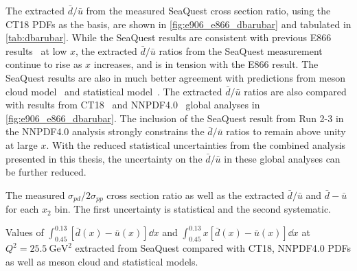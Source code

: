 \documentclass[reprint,aps,unsortedaddress,superscriptaddress,prc,floatfix,showpacs,linenumbers,final]{revtex4-2}
\begin{document}
The extracted $\bar{d}/\bar{u}$ from the measured SeaQuest cross section ratio,
using the CT18 PDFs as the basis, are shown in \cref{fig:e906_e866_dbarubar}
and tabulated in \cref{tab:dbarubar}.
While the SeaQuest results are consistent with previous E866 results~\cite{towell2001} at low $x$,
the extracted $\bar{d}/\bar{u}$ ratios from the SeaQuest measurement continue to rise as $x$ increases,
and is in tension with the E866 result.
The SeaQuest results are also in much better agreement with predictions from meson cloud model~\cite{alberg2022}
and statistical model~\cite{soffer2019}.
The extracted $\bar{d}/\bar{u}$ ratios are also compared with results from CT18~\cite{hou2021} and NNPDF4.0~\cite{ball2022a}
global analyses in \cref{fig:e906_e866_dbarubar}.
The inclusion of the SeaQuest result from Run 2-3 in the NNPDF4.0 analysis strongly constrains the $\bar{d}/\bar{u}$ ratios
to remain above unity at large $x$.
With the reduced statistical uncertainties from the combined analysis presented in this thesis,
the uncertainty on the $\bar{d}/\bar{u}$ in these global analyses can be further reduced.

\begin{table}[htbp!]
	\centering
	\caption{The measured $\sigma_{pd}/2\sigma_{pp}$ cross section ratio as well
		as the extracted $\bar{d}/\bar{u}$ and $\bar{d}-\bar{u}$ for each $x_{2}$ bin.
		The first uncertainty is statistical and the second systematic.}
	\label{tab:dbarubar}
	\begin{adjustbox}{max width=\textwidth}
		
	\end{adjustbox}
\end{table}
\begin{table}[htbp!]
	\centering
	\caption{Values of $\int_{0.45}^{0.13} \left[\bar{d}\left(x\right) - \bar{u}\left(x\right)\right] \dd{x}$
		and $\int_{0.45}^{0.13} x\left[\bar{d}\left(x\right) - \bar{u}\left(x\right)\right] \dd{x}$ at $Q^2=\SI{25.5}{\GeV\squared}$ extracted from
		SeaQuest compared with CT18, NNPDF4.0 PDFs as well as meson cloud and statistical models.}
	\label{tab:dbarMubar}
	\begin{adjustbox}{max width=\textwidth}
		
	\end{adjustbox}
\end{table}
\end{document}
